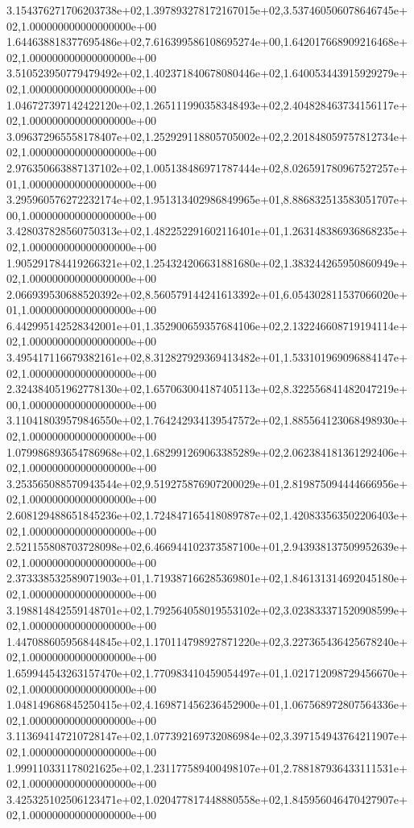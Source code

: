 3.154376271706203738e+02,1.397893278172167015e+02,3.537460506078646745e+02,1.000000000000000000e+00
1.644638818377695486e+02,7.616399586108695274e+00,1.642017668909216468e+02,1.000000000000000000e+00
3.510523950779479492e+02,1.402371840678080446e+02,1.640053443915929279e+02,1.000000000000000000e+00
1.046727397142422120e+02,1.265111990358348493e+02,2.404828463734156117e+02,1.000000000000000000e+00
3.096372965558178407e+02,1.252929118805705002e+02,2.201848059757812734e+02,1.000000000000000000e+00
2.976350663887137102e+02,1.005138486971787444e+02,8.026591780967527257e+01,1.000000000000000000e+00
3.295960576272232174e+02,1.951313402986849965e+01,8.886832513583051707e+00,1.000000000000000000e+00
3.428037828560750313e+02,1.482252291602116401e+01,1.263148386936868235e+02,1.000000000000000000e+00
1.905291784419266321e+02,1.254324206631881680e+02,1.383244265950860949e+02,1.000000000000000000e+00
2.066939530688520392e+02,8.560579144241613392e+01,6.054302811537066020e+01,1.000000000000000000e+00
6.442995142528342001e+01,1.352900659357684106e+02,2.132246608719194114e+02,1.000000000000000000e+00
3.495417116679382161e+02,8.312827929369413482e+01,1.533101969096884147e+02,1.000000000000000000e+00
2.324384051962778130e+02,1.657063004187405113e+02,8.322556841482047219e+00,1.000000000000000000e+00
3.110418039579846550e+02,1.764242934139547572e+02,1.885564123068498930e+02,1.000000000000000000e+00
1.079986893654786968e+02,1.682991269063385289e+02,2.062384181361292406e+02,1.000000000000000000e+00
3.253565088570943544e+02,9.519275876907200029e+01,2.819875094444666956e+02,1.000000000000000000e+00
2.608129488651845236e+02,1.724847165418089787e+02,1.420833563502206403e+02,1.000000000000000000e+00
2.521155808703728098e+02,6.466944102373587100e+01,2.943938137509952639e+02,1.000000000000000000e+00
2.373338532589071903e+01,1.719387166285369801e+02,1.846131314692045180e+02,1.000000000000000000e+00
3.198814842559148701e+02,1.792564058019553102e+02,3.023833371520908599e+02,1.000000000000000000e+00
1.447088605956844845e+02,1.170114798927871220e+02,3.227365436425678240e+02,1.000000000000000000e+00
1.659944543263157470e+02,1.770983410459054497e+01,1.021712098729456670e+02,1.000000000000000000e+00
1.048149686845250415e+02,4.169871456236452900e+01,1.067568972807564336e+02,1.000000000000000000e+00
3.113694147210728147e+02,1.077392169732086984e+02,3.397154943764211907e+02,1.000000000000000000e+00
1.999110331178021625e+02,1.231177589400498107e+01,2.788187936433111531e+02,1.000000000000000000e+00
3.425325102506123471e+02,1.020477817448880558e+02,1.845956046470427907e+02,1.000000000000000000e+00
